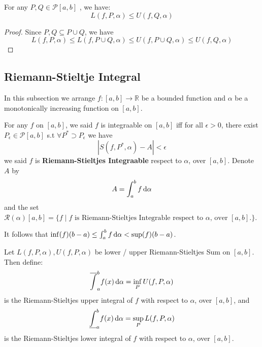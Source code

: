 \documentclass[
	UTF-8,
	11pt, %
	a4paper, %
]{LegrandOrangeBook}
\begin{document}
    \begin{corollary}
        For any $P,Q \in \mathcal{P}[a,b]$ , we have:
        $$
            L(f,P,\alpha) \leq U(f,Q,\alpha) 
        $$
    \end{corollary}

    \begin{proof}
        Since $P,Q \subseteq P \cup Q$, we have
        $$L(f,P,\alpha) \leq L(f,P\cup Q,\alpha) \leq U(f,P\cup Q,\alpha) \leq U(f,Q,\alpha)$$
    \end{proof}

    \newpage

    \subsection{Riemann-Stieltje Integral}

    In this subsection we arrange $f: [a, b] \to \mathbb{R} $ be a bounded function and 
        $\alpha$ be a monotonically increasing function on $[a, b]$.

    \begin{definition}
        For any $f$ on $[a,b]$, we said $f$ is integraable on $[a,b]$ iff for all  $\epsilon > 0$, 
        there exist $P_{\epsilon} \in \mathcal{P}[a,b]$ s.t $\forall P^{*} \supset P_{\epsilon}$ we have
        $$
            \left| S(f,P^{*},\alpha) - A \right| < \epsilon
        $$
        we said $f$ is \textbf{Riemann-Stieltjes Integraable} respect to $\alpha$, over $[a,b]$. Denote $A$ by 
        $$
            A  = \int_{a}^{b} f \, \mathrm{d} \alpha
        $$
        and the set $\mathcal{R}(\alpha)[a,b] = \{ f \mid \text{$f$ is Riemann-Stieltjes Integrable respect to $\alpha$, over $[a,b]$.} \}$.
    \end{definition}

    \begin{remark}
        It follows that $\inf (f) (b-a) \leq \int_{a}^{b} f \, \mathrm{d} \alpha < \sup (f) (b-a)$.
    \end{remark}

    \begin{definition}
    
        Let $L(f, P,\alpha), U(f, P,\alpha)$ be 
        lower / upper Riemann-Stieltjes Sum on $[a,b]$.
        Then define:
        $$
            \overline{\int}_{a}^{b}f(x) \, \mathrm{d} \alpha = \inf_P U(f, P,\alpha)
        $$
        is the Riemann-Stieltjes upper integral of $f$ with respect to $\alpha$, over $[a, b ]$, and
        $$
            \underline{\int}_{a}^{b}f(x) \, \mathrm{d} \alpha = \sup_P L(f, P,\alpha)
        $$
        is the Riemann-Stieltjes lower integral of $f$ with respect to $\alpha$, over $[a, b ]$.

    \end{definition}
\end{document}
